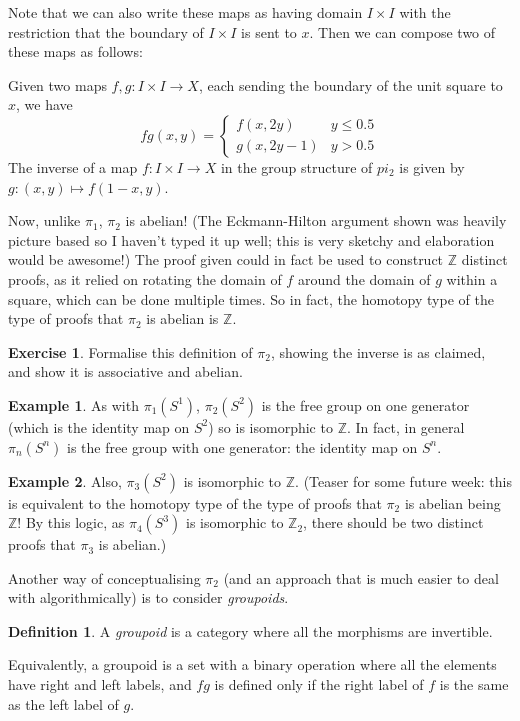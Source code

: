\documentclass[a4paper,12pt]{article}
\newcommand{\ZZ}{\mathbb{Z}}
\theoremstyle{definition}
\newtheorem*{defn}{Definition}
\newtheorem*{exer}{Exercise}
\newtheorem*{example}{Example}
\begin{document}
Note that we can also write these maps as having domain $I\times I$ with the restriction that the boundary of $I\times I$ is sent to $x$.
Then we can compose two of these maps as follows:

Given two maps $f, g: I\times I\to X$, each sending the boundary of the unit square to $x$, we have
$$fg(x, y) = \begin{cases}
		f(x, 2y) & y\leq 0.5\\
		g(x, 2y-1) & y > 0.5
	\end{cases}$$
The inverse of a map $f: I\times I\to X$ in the group structure of $pi_2$ is given by $g: (x, y)\mapsto f(1-x, y)$.

Now, unlike $\pi_1$, $\pi_2$ is abelian!
(The Eckmann-Hilton argument shown was heavily picture based so I haven't typed it up well; this is very sketchy and elaboration would be awesome!)
The proof given could in fact be used to construct $\ZZ$ distinct proofs, as it relied on rotating the domain of $f$ around the domain of $g$ within a square, which can be done multiple times.
So in fact, the homotopy type of the type of proofs that $\pi_2$ is abelian is $\ZZ$.

\begin{exer}
Formalise this definition of $\pi_2$, showing the inverse is as claimed, and show it is associative and abelian.
\end{exer}

\begin{example}
As with $\pi_1(S^1)$, $\pi_2(S^2)$ is the free group on one generator (which is the identity map on $S^2$) so is isomorphic to $\ZZ$.
In fact, in general $\pi_n(S^n)$ is the free group with one generator: the identity map on $S^n$.
\end{example}

\begin{example}
Also, $\pi_3(S^2)$ is isomorphic to $\ZZ$.
(Teaser for some future week: this is equivalent to the homotopy type of the type of proofs that $\pi_2$ is abelian being $\ZZ$! By this logic, as $\pi_4(S^3)$ is isomorphic to $\ZZ_2$, there should be two distinct proofs that $\pi_3$ is abelian.)
\end{example}

Another way of conceptualising $\pi_2$ (and an approach that is much easier to deal with algorithmically) is to consider \emph{groupoids}.

\begin{defn}
A \emph{groupoid} is a category where all the morphisms are invertible.

Equivalently, a groupoid is a set with a binary operation where all the elements have right and left labels, and $fg$ is defined only if the right label of $f$ is the same as the left label of $g$.
\end{defn}
\end{document}
